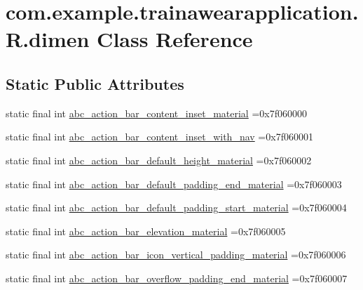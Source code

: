 \hypertarget{classcom_1_1example_1_1trainawearapplication_1_1_r_1_1dimen}{}\section{com.\+example.\+trainawearapplication.\+R.\+dimen Class Reference}
\label{classcom_1_1example_1_1trainawearapplication_1_1_r_1_1dimen}
\subsection*{Static Public Attributes}
\begin{DoxyCompactItemize}
\item 
static final int \mbox{\hyperlink{classcom_1_1example_1_1trainawearapplication_1_1_r_1_1dimen_aeb64eab7955e2b9e571805aa06252df6}{abc\+\_\+action\+\_\+bar\+\_\+content\+\_\+inset\+\_\+material}} =0x7f060000
\item 
static final int \mbox{\hyperlink{classcom_1_1example_1_1trainawearapplication_1_1_r_1_1dimen_a7d2cafcdbcb0bea33030929a9eaef435}{abc\+\_\+action\+\_\+bar\+\_\+content\+\_\+inset\+\_\+with\+\_\+nav}} =0x7f060001
\item 
static final int \mbox{\hyperlink{classcom_1_1example_1_1trainawearapplication_1_1_r_1_1dimen_a5d5a8f7a36b587c6a604c4a2353f3e3e}{abc\+\_\+action\+\_\+bar\+\_\+default\+\_\+height\+\_\+material}} =0x7f060002
\item 
static final int \mbox{\hyperlink{classcom_1_1example_1_1trainawearapplication_1_1_r_1_1dimen_a44e2656c8182e330442294bf13d2a61b}{abc\+\_\+action\+\_\+bar\+\_\+default\+\_\+padding\+\_\+end\+\_\+material}} =0x7f060003
\item 
static final int \mbox{\hyperlink{classcom_1_1example_1_1trainawearapplication_1_1_r_1_1dimen_a0481ab73e2a147f42a2f1271deb245d3}{abc\+\_\+action\+\_\+bar\+\_\+default\+\_\+padding\+\_\+start\+\_\+material}} =0x7f060004
\item 
static final int \mbox{\hyperlink{classcom_1_1example_1_1trainawearapplication_1_1_r_1_1dimen_ae50568767ab98820cb913bd6065ec261}{abc\+\_\+action\+\_\+bar\+\_\+elevation\+\_\+material}} =0x7f060005
\item 
static final int \mbox{\hyperlink{classcom_1_1example_1_1trainawearapplication_1_1_r_1_1dimen_afdd6ea4e84abf01490f6983b352e7a2e}{abc\+\_\+action\+\_\+bar\+\_\+icon\+\_\+vertical\+\_\+padding\+\_\+material}} =0x7f060006
\item 
static final int \mbox{\hyperlink{classcom_1_1example_1_1trainawearapplication_1_1_r_1_1dimen_a8cab86be4e20be5fe4699a6a0aad9d07}{abc\+\_\+action\+\_\+bar\+\_\+overflow\+\_\+padding\+\_\+end\+\_\+material}} =0x7f060007

\end{DoxyCompactItemize}
